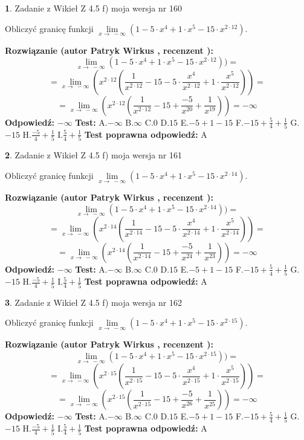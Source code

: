 \documentclass[12pt, a4paper]{article}
\theoremstyle{definition} %
\newtheorem{zad}{}
\newcommand{\zadStart}[1]{\begin{zad}#1\newline}
\newcommand{\zadStop}{\end{zad}}
\newcommand{\rozwStart}[2]{\noindent \textbf{Rozwiązanie (autor #1 , recenzent #2): }\newline}
\newcommand{\rozwStop}{\newline}
\newcommand{\odpStart}{\noindent \textbf{Odpowiedź:}\newline}
\newcommand{\odpStop}{\newline}
\newcommand{\testStart}{\noindent \textbf{Test:}\newline}
\newcommand{\testStop}{\newline}
\newcommand{\kluczStart}{\noindent \textbf{Test poprawna odpowiedź:}\newline}
\newcommand{\kluczStop}{\newline}
\begin{document}
\zadStart{Zadanie z Wikieł Z 4.5 f) moja wersja nr 160}



Obliczyć granicę funkcji  $\lim\limits_{x\to\ -\infty}(1 - 5 \cdot x^{4}+1 \cdot x^{5}- 15 \cdot x^{2\cdot12})$.
\zadStop
\rozwStart{Patryk Wirkus}{}
$$\lim\limits_{x\to\ -\infty}(1 - 5 \cdot x^{4}+1 \cdot x^{5}- 15 \cdot x^{2\cdot12}))=$$
$$=\lim\limits_{x\to\ -\infty}(x^{2\cdot12}(\frac{1}{x^{2\cdot12}}-15 -5 \cdot \frac{x^{4}}{x^{2\cdot12}}+1 \cdot \frac{x^{5}}{x^{2\cdot12}}))=$$
$$=\lim\limits_{x\to\ -\infty}(x^{2\cdot12}(\frac{1}{x^{2\cdot12}}-15 + \frac{-5}{x^{20}}+ \frac{1}{x^{19}}))=-\infty$$
\rozwStop
\odpStart
$-\infty$
\odpStop
\testStart
A.$-\infty$ B.$\infty$ C.$0$ D.$15$ E.$-5 + 1 - 15$
F.$-15+\frac{5}{4}+\frac{1}{5}$ G.$-15$
H.$\frac{-5}{4}+\frac{1}{5}$
I.$\frac{5}{4}+\frac{1}{5}$
\testStop
\kluczStart
A
\kluczStop



\zadStart{Zadanie z Wikieł Z 4.5 f) moja wersja nr 161}



Obliczyć granicę funkcji  $\lim\limits_{x\to\ -\infty}(1 - 5 \cdot x^{4}+1 \cdot x^{5}- 15 \cdot x^{2\cdot14})$.
\zadStop
\rozwStart{Patryk Wirkus}{}
$$\lim\limits_{x\to\ -\infty}(1 - 5 \cdot x^{4}+1 \cdot x^{5}- 15 \cdot x^{2\cdot14}))=$$
$$=\lim\limits_{x\to\ -\infty}(x^{2\cdot14}(\frac{1}{x^{2\cdot14}}-15 -5 \cdot \frac{x^{4}}{x^{2\cdot14}}+1 \cdot \frac{x^{5}}{x^{2\cdot14}}))=$$
$$=\lim\limits_{x\to\ -\infty}(x^{2\cdot14}(\frac{1}{x^{2\cdot14}}-15 + \frac{-5}{x^{24}}+ \frac{1}{x^{23}}))=-\infty$$
\rozwStop
\odpStart
$-\infty$
\odpStop
\testStart
A.$-\infty$ B.$\infty$ C.$0$ D.$15$ E.$-5 + 1 - 15$
F.$-15+\frac{5}{4}+\frac{1}{5}$ G.$-15$
H.$\frac{-5}{4}+\frac{1}{5}$
I.$\frac{5}{4}+\frac{1}{5}$
\testStop
\kluczStart
A
\kluczStop



\zadStart{Zadanie z Wikieł Z 4.5 f) moja wersja nr 162}



Obliczyć granicę funkcji  $\lim\limits_{x\to\ -\infty}(1 - 5 \cdot x^{4}+1 \cdot x^{5}- 15 \cdot x^{2\cdot15})$.
\zadStop
\rozwStart{Patryk Wirkus}{}
$$\lim\limits_{x\to\ -\infty}(1 - 5 \cdot x^{4}+1 \cdot x^{5}- 15 \cdot x^{2\cdot15}))=$$
$$=\lim\limits_{x\to\ -\infty}(x^{2\cdot15}(\frac{1}{x^{2\cdot15}}-15 -5 \cdot \frac{x^{4}}{x^{2\cdot15}}+1 \cdot \frac{x^{5}}{x^{2\cdot15}}))=$$
$$=\lim\limits_{x\to\ -\infty}(x^{2\cdot15}(\frac{1}{x^{2\cdot15}}-15 + \frac{-5}{x^{26}}+ \frac{1}{x^{25}}))=-\infty$$
\rozwStop
\odpStart
$-\infty$
\odpStop
\testStart
A.$-\infty$ B.$\infty$ C.$0$ D.$15$ E.$-5 + 1 - 15$
F.$-15+\frac{5}{4}+\frac{1}{5}$ G.$-15$
H.$\frac{-5}{4}+\frac{1}{5}$
I.$\frac{5}{4}+\frac{1}{5}$
\testStop
\kluczStart
A
\kluczStop
\end{document}
